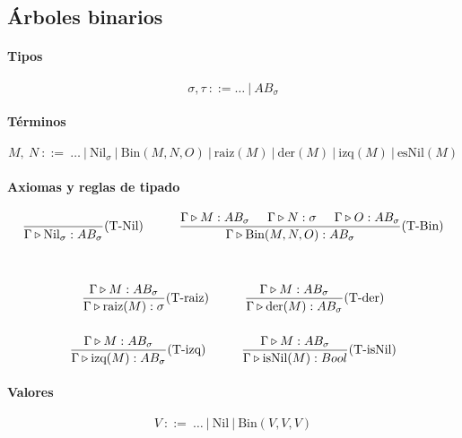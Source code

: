\subsection{Árboles binarios}

\paragraph{Tipos}
$$\sigma,\tau~::= \dots~|~AB_\sigma$$

\paragraph{Términos}
$$M,~N~::=~\dots~|~\text{Nil}_\sigma~|~\text{Bin}(M, N, O)~|~\text{raiz}(M)~|~\text{der}(M)~|~\text{izq}(M)~|~\text{esNil}(M)$$
\paragraph{Axiomas y reglas de tipado}
\begin{equation*}
	\begin{gathered}
		\frac{}{\judgeType{\Gamma}{\text{Nil}_\sigma}{AB_\sigma}}(\text{T-Nil})\hspace*{1cm}
		\frac{\judgeType{\Gamma}{M}{AB_\sigma}\hspace*{5mm}\judgeType{\Gamma}{N}{\sigma}\hspace*{5mm}\judgeType{\Gamma}{O}{AB_\sigma}}{\judgeType{\Gamma}{\text{Bin}(M, N, O)}{AB_\sigma}}(\text{T-Bin}) \\
		\vspace*{5mm}\\
		\frac{\judgeType{\Gamma}{M}{AB_\sigma}}{\judgeType{\Gamma}{\text{raiz}(M)}{\sigma}}(\text{T-raiz})\hspace*{1cm}
		\frac{\judgeType{\Gamma}{M}{AB_\sigma}}{\judgeType{\Gamma}{\text{der}(M)}{AB_\sigma}}(\text{T-der})
		\vspace*{5mm} \\
		\frac{\judgeType{\Gamma}{M}{AB_\sigma}}{\judgeType{\Gamma}{\text{izq}(M)}{AB_\sigma}}(\text{T-izq})
		\hspace*{1cm}
		\frac{\judgeType{\Gamma}{M}{AB_\sigma}}{\judgeType{\Gamma}{\text{isNil}(M)}{Bool}}(\text{T-isNil})
	\end{gathered}
\end{equation*}

\paragraph{Valores}
$$V~::=~\dots~|~\text{Nil}~|~\text{Bin}(V,V,V)$$

